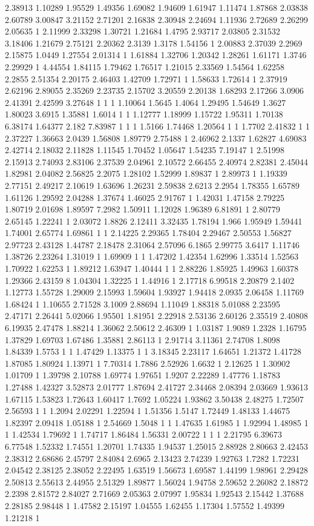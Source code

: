 2.38913 1.10289 1.95529 1.49356 1.69082 1.94609 1.61947 1.11474 1.87868 2.03838 2.60789 3.00847 3.21152 2.71201 2.16838 2.30948 2.24694 1.11936 2.72689 2.26299 2.05635 1 2.11999 2.33298 1.30721 1.21684 1.4795 2.93717 2.03805 2.31532 3.18406 1.21679 2.75121 2.20362 2.3139 1.3178 1.54156 1 2.00883 2.37039 2.2969 2.15875 1.0449 1.27554 2.01314 1 1.61884 1.32706 1.20342 1.28261 1.61171 1.3746 2.29929 1 4.44554 1.84115 1.79462 1.76517 1.21015 2.33569 1.54564 1.62258 2.2855 2.51354 2.20175 2.46403 1.42709 1.72971 1 1.58633 1.72614 1 2.37919 2.62196 2.89055 2.35269 2.23735 2.15702 3.20559 2.20138 1.68293 2.17266 3.0906 2.41391 2.42599 3.27648 1 1 1 1.10064 1.5645 1.4064 1.29495 1.54649 1.3627 1.80023 3.6915 1.35881 1.6014 1 1 1.12777 1.18999 1.15722 1.95311 1.70138 6.38174 1.64377 2.182 7.83987 1 1 1 1.5166 1.74468 1.20564 1 1 1.7702 2.41832 1 1 2.37227 1.36663 2.0439 1.56808 1.89779 2.75488 1 2.46962 2.1337 1.62827 4.69083 2.42714 2.18032 2.11828 1.11545 1.70452 1.05647 1.54235 7.19147 1 2.51998 2.15913 2.74093 2.83106 2.37539 2.04961 2.10572 2.66455 2.40974 2.82381 2.45044 1.82981 2.04082 2.56825 2.2075 1.28102 1.52999 1.89837 1 2.89973 1 1.19339 2.77151 2.49217 2.10619 1.63696 1.26231 2.59838 2.6213 2.2954 1.78355 1.65789 1.61126 1.29592 2.04288 1.37674 1.46025 2.91767 1 1.42031 1.47158 2.79225 1.80719 2.01698 1.89597 7.2982 1.50911 1.12028 1.96389 6.81891 1 2.80779 2.65145 1.22241 1 2.03072 1.8826 2.12411 3.32435 1.78194 1.966 1.95949 1.59441 1.74001 2.65774 1.69861 1 1 2.14225 2.29365 1.78404 2.29467 2.50553 1.56827 2.97723 2.43128 1.44787 2.18478 2.31064 2.57096 6.1865 2.99775 3.6417 1.11746 1.38726 2.23264 1.31019 1 1.69909 1 1 1.47202 1.42354 1.62996 1.33514 1.52563 1.70922 1.62253 1 1.89212 1.63947 1.40444 1 1 2.88226 1.85925 1.49963 1.60378 1.29366 2.43159 8 1.04304 1.32225 1 1.44916 1 2.17718 6.99518 2.20879 2.1402 1.12773 1.55728 1.29009 2.15993 1.59604 1.93927 1.94418 2.0935 2.06458 1.11769 1.68424 1 1.10655 2.71528 3.1009 2.88694 1.11049 1.88318 5.01088 2.23595 2.47171 2.26441 5.02066 1.95501 1.81951 2.22918 2.53136 2.60126 2.35519 2.40808 6.19935 2.47478 1.88214 1.36062 2.50612 2.46309 1 1.03187 1.9089 1.2328 1.16795 1.37829 1.69703 1.67486 1.35881 2.86113 1 2.91714 3.11361 2.74708 1.8098 1.84339 1.5753 1 1 1.47429 1.13375 1 1 3.18345 2.23117 1.64651 1.21372 1.41728 1.87085 1.80924 1.13971 1 7.70314 1.7886 2.52926 1.6632 1 2.12625 1 1.30902 1.01709 1 1.39798 2.10788 1.69774 1.97651 1.9207 2.22289 1.47776 1.18783 1.27488 1.42327 3.52873 2.01777 1.87694 2.41727 2.34468 2.08394 2.03669 1.93613 1.67115 1.53823 1.72643 1.60417 1.7692 1.05224 1.93862 3.50438 2.48275 1.72507 2.56593 1 1 1.2094 2.02291 1.22594 1 1.51356 1.5147 1.72449 1.48133 1.44675 1.82397 2.09418 1.05188 1 2.54669 1.5048 1 1 1.47635 1.61985 1 1.92994 1.48985 1 1 1.42534 1.79692 1 1.74717 1.86484 1.56331 2.00722 1 1 1 2.21795 6.39673 6.77548 1.52332 1.74551 1.20701 1.74335 1.94537 1.25015 2.88928 2.80663 2.42453 2.38312 2.68686 2.45797 2.84084 2.6965 2.13423 2.74239 1.92763 1.7282 1.72231 2.04542 2.38125 2.38052 2.22495 1.63519 1.56673 1.69587 1.44199 1.98961 2.29428 2.50813 2.55613 2.44955 2.51329 1.89877 1.56024 1.94758 2.59652 2.26082 2.18872 2.2398 2.81572 2.84027 2.71669 2.05363 2.07997 1.95834 1.92543 2.15442 1.37688 2.28185 2.98448 1 1.47582 2.15197 1.04555 1.62455 1.17304 1.57552 1.49399 1.21218 1 